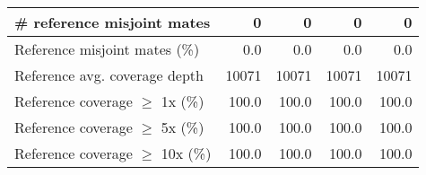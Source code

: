\documentclass[12pt,a4paper]{article}
\begin{document}
\begin{table}[ht]
\begin{center}
\begin{tabular}{|l*{4}{|r}|}
\# reference misjoint mates & 0 & 0 & 0 & 0 \\ \hline
Reference misjoint mates (\%) & 0.0 & 0.0 & 0.0 & 0.0 \\ \hline
Reference avg. coverage depth & 10071 & 10071 & 10071 & 10071 \\ \hline
Reference coverage $\geq$ 1x (\%) & 100.0 & 100.0 & 100.0 & 100.0 \\ \hline
Reference coverage $\geq$ 5x (\%) & 100.0 & 100.0 & 100.0 & 100.0 \\ \hline
Reference coverage $\geq$ 10x (\%) & 100.0 & 100.0 & 100.0 & 100.0 \\ \hline
\end{tabular}
\end{center}
\end{table}
\end{document}
